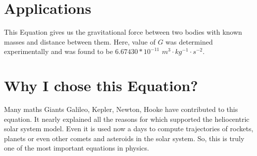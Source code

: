 \documentclass{article}
\begin{document}
\section{Applications}
This Equation gives us the gravitational force between two bodies with known masses and distance between them. Here, value of \(G\) was determined experimentally and was found to be \(6.67430 * 10^{-11}\) \(m^{3} \cdot kg^{-1} \cdot s^{-2}\). 



\section{Why I chose this Equation?}
Many maths Giants Galileo, Kepler, Newton, Hooke have contributed to this equation. It nearly explained all the reasons for which supported the heliocentric solar system model. Even it is used now a days to compute trajectories of rockets, planets or even other comets and asteroids in the solar system. So, this is truly one of the most important equations in physics. 
\end{document}
